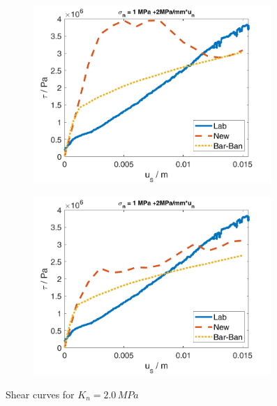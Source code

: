 \begin{figure}
\begin{subfigure}[c]{0.48\textwidth}
\includegraphics[width=0.99\textwidth]{./figures/MEX3-2_2ShearCurveOrig.png}
\end{subfigure}
\begin{subfigure}[c]{0.48\textwidth}
\includegraphics[width=0.99\textwidth]{./figures/MEX3-2_2ShearCurveWithout.png}
\end{subfigure}
\caption{Shear curves for $K_n=2.0\,\unit{MPa}$}
\label{fig:MEX3_2_2ShearCurve}
\end{figure}


